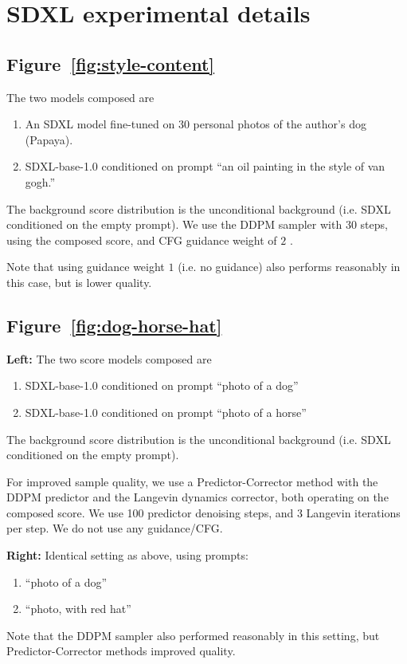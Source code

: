\section{SDXL experimental details}
\label{app:sdxl_detail}


\subsection{Figure~\ref{fig:style-content}}

The two models composed are
\begin{enumerate}
    \item An SDXL model \citep{podell2023sdxl} fine-tuned 
    on 30 personal photos of the author's dog (Papaya).
    \item SDXL-base-1.0 \citep{podell2023sdxl}
    conditioned on prompt ``an oil painting in the style of van gogh.''
\end{enumerate}

The background score distribution is the unconditional background 
(i.e. SDXL conditioned on the empty prompt).
We use the DDPM sampler \citep{ho2020denoising} with 30 steps,
using the composed score, and CFG guidance weight of $2$ \citet{ho2020denoising}.

Note that using guidance weight $1$ (i.e. no guidance)
also performs reasonably in this case, but is lower quality.


\subsection{Figure~\ref{fig:dog-horse-hat}}
{\bf Left:}
The two score models composed are
\begin{enumerate}
    \item SDXL-base-1.0 \citep{podell2023sdxl}
    conditioned on prompt ``photo of a dog''
    \item SDXL-base-1.0 \citep{podell2023sdxl}
    conditioned on prompt ``photo of a horse''
\end{enumerate}
The background score distribution is the unconditional background 
(i.e. SDXL conditioned on the empty prompt).

For improved sample quality, we use
a Predictor-Corrector method \citep{song2020score}
with the DDPM predictor and the Langevin dynamics corrector,
both operating on the composed score.
We use 100 predictor denoising steps, and 3 Langevin iterations
per step.
We do not use any guidance/CFG.

{\bf Right:}
Identical setting as above, using prompts:
\begin{enumerate}
    \item ``photo of a dog''
    \item ``photo, with red hat''
\end{enumerate}

Note that the DDPM sampler also performed reasonably in this setting,
but Predictor-Corrector methods improved quality.
